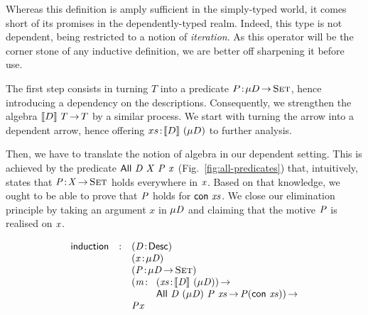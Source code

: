 Whereas this definition is amply sufficient in the simply-typed world,
it comes short of its promises in the dependently-typed realm. Indeed,
this type is not dependent, being restricted to a notion of
\emph{iteration}. As this operator will be the corner stone of any
inductive definition, we are better off sharpening it before use.

The first step consists in turning $T$ into a predicate
$\Bhab{P}{\Mu{D} \To \Set}$, hence introducing a dependency on the
descriptions. Consequently, we strengthen the algebra $\descop{D}{T}
\To T$ by a similar process. We start with turning the arrow into a
dependent arrow, hence offering $\Bhab{xs}{\descop{D}{(\Mu{D})}}$ to
further analysis. 

Then, we have to translate the notion of algebra in our dependent
setting. This is achieved by the predicate $\All{\V{D}}{\V{X}}{\V{P}}{\V{x}}$
(Fig.~\ref{fig:all-predicates}) that, intuitively, states that
$\Bhab{\V{P}}{\V{X} \To \Set}$ holds everywhere in $\V{x}$. Based on that
knowledge, we ought to be able to prove that $\V{P}$ holds for
$\Con{\V{xs}}$. We close our elimination principle by taking an argument
$x$ in $\Mu{\V{D}}$ and claiming that the motive $\V{P}$ is realised on $\V{x}$.

\[
\begin{array}{lcll}
\F{induction} & : & \multicolumn{2}{l}{\PITEL{\V{D}}{\Desc}}                   \\
              &   & \multicolumn{2}{l}{\PITEL{\V{x}}{\Mu{\V{D}}}}                   \\
              &   & \multicolumn{2}{l}{\PITEL{\V{P}}{\Mu{\V{D}} \To \Set}}         \\
              &   & \PI{\V{m}}{& \PI{\V{xs}}{\descop{\V{D}}{(\Mu{\V{D}})}}              \\
              &   &           & \All{\V{D}}{(\Mu{\V{D}})}{\V{P}}{\V{xs}} \To \V{P} (\Con{\V{xs}})} \\
              &   & \V{P} \V{x}
\end{array}
\]

